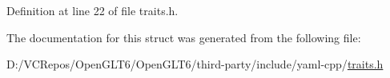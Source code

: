 Definition at line 22 of file traits.\+h.



The documentation for this struct was generated from the following file\+:\begin{DoxyCompactItemize}
\item 
D\+:/\+V\+C\+Repos/\+Open\+G\+L\+T6/\+Open\+G\+L\+T6/third-\/party/include/yaml-\/cpp/\mbox{\hyperlink{traits_8h}{traits.\+h}}\end{DoxyCompactItemize}
